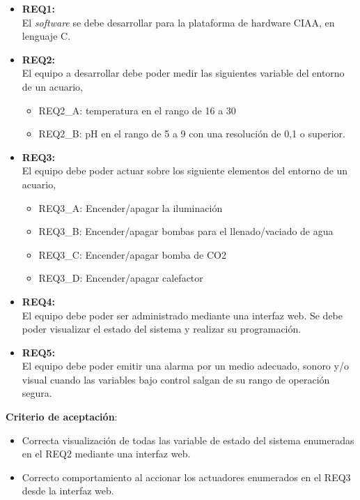 \begin{itemize}
	\item \textbf{REQ1:}\\ El \textit{software} se debe desarrollar para la plataforma de hardware CIAA, en lenguaje C.
	\item \textbf{REQ2:}\\ El equipo a desarrollar debe poder medir las siguientes variable del entorno de un acuario,
	\begin{itemize}
		\item REQ2\_A: temperatura en el rango de 16 a 30 %
		\item REQ2\_B: pH en el rango de 5 a 9 con una resolución de 0,1 o superior.
	\end{itemize}
	\item \textbf{REQ3:}\\ El equipo debe poder actuar sobre los siguiente elementos del entorno de un acuario,
	\begin{itemize}
		\item REQ3\_A: Encender/apagar la iluminación
		\item REQ3\_B: Encender/apagar bombas para el llenado/vaciado de agua
		\item REQ3\_C: Encender/apagar bomba de CO2
		\item REQ3\_D: Encender/apagar calefactor
	\end{itemize}
	\item \textbf{REQ4:}\\ El equipo debe poder ser administrado mediante una interfaz web. Se debe poder visualizar el estado del sistema y realizar su programación.
	\item \textbf{REQ5:}\\ El equipo debe poder emitir una alarma por un medio adecuado, sonoro y/o visual cuando las variables bajo control salgan de su rango de operación segura.
\end{itemize}

\textbf{Criterio de aceptación}:
	\begin{itemize}
		\item Correcta visualización de todas las variable de estado del sistema enumeradas en el REQ2 mediante una interfaz web.
		\item Correcto comportamiento al accionar los actuadores enumerados en el REQ3 desde la interfaz web.
	\end{itemize}

